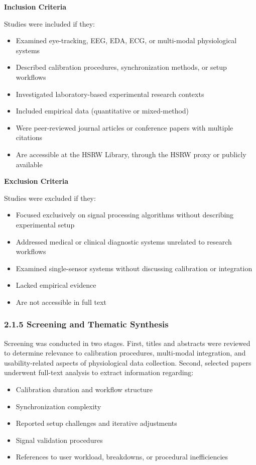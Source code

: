 \documentclass[
]{article}
\begin{document}
\textbf{Inclusion Criteria}

Studies were included if they:

\begin{itemize}
\item
  Examined eye-tracking, EEG, EDA, ECG, or multi-modal physiological systems
\item
  Described calibration procedures, synchronization methods, or setup workflows
\item
  Investigated laboratory-based experimental research contexts
\item
  Included empirical data (quantitative or mixed-method)
\item
  Were peer-reviewed journal articles or conference papers with multiple citations
\item
  Are accessible at the HSRW Library, through the HSRW proxy or publicly available
\end{itemize}

\textbf{Exclusion Criteria}

Studies were excluded if they:

\begin{itemize}
\item
  Focused exclusively on signal processing algorithms without describing experimental setup
\item
  Addressed medical or clinical diagnostic systems unrelated to research workflows
\item
  Examined single-sensor systems without discussing calibration or integration
\item
  Lacked empirical evidence
\item
  Are not accessible in full text
\end{itemize}

\hypertarget{screening-and-thematic-synthesis}{%
\subsubsection{2.1.5 Screening and Thematic Synthesis}\label{screening-and-thematic-synthesis}}

Screening was conducted in two stages. First, titles and abstracts were reviewed to determine relevance to calibration procedures, multi-modal integration, and usability-related aspects of physiological data collection. Second, selected papers underwent full-text analysis to extract information regarding:

\begin{itemize}
\item
  Calibration duration and workflow structure
\item
  Synchronization complexity
\item
  Reported setup challenges and iterative adjustments
\item
  Signal validation procedures
\item
  References to user workload, breakdowns, or procedural inefficiencies
\end{itemize}
\end{document}
